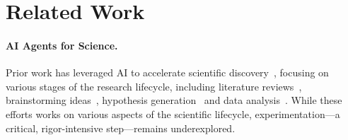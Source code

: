 \section{Related Work}
\label{subsec:related-work}



\paragraph{AI Agents for Science.}
Prior work has leveraged AI to accelerate scientific discovery~\cite{berens2023aiscienceemergingagenda, Kitano2021}, focusing on various stages of the research lifecycle, including literature reviews~\cite{agarwal2024litllm, paper-review1}, brainstorming ideas~\cite{gu2024generation, bran2024knowledge}, hypothesis generation~\cite{sourati2023accelerating, hypothesis1, hypothesis2, hypothesis3} and data analysis~\cite{hong2024data, chen2024scienceagentbench}.
While these efforts works on various aspects of the scientific lifecycle, experimentation—a critical, rigor-intensive step—remains underexplored.

